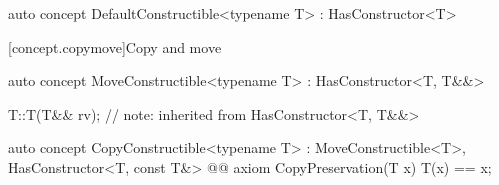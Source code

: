 \documentclass[american,twoside]{book}
\begin{document}
\begin{itemdescr}
\pnum
{}
\end{itemdescr}

\begin{itemdecl}
auto concept DefaultConstructible<typename T> : HasConstructor<T> { }
\end{itemdecl}

\begin{itemdescr}
\pnum
{}
\end{itemdescr}

[concept.copymove]{Copy and move}
\begin{itemdecl}
auto concept MoveConstructible<typename T> : HasConstructor<T, T&&> { }
\end{itemdecl}

\begin{itemdescr}
\pnum
{}
\end{itemdescr}

\begin{itemdecl}
T::T(T&& rv); // note: inherited from HasConstructor<T, T\&\&>
\end{itemdecl}

\begin{itemdescr}
\pnum
{}
\end{itemdescr}

\begin{itemdecl}
auto concept CopyConstructible<typename T> : MoveConstructible<T>, HasConstructor<T, const T&> {
  @@
  axiom CopyPreservation(T x) {
    T(x) == x;
  }
}
\end{itemdecl}

\begin{itemdescr}
\pnum 
{}
\end{itemdescr}
\end{document}
